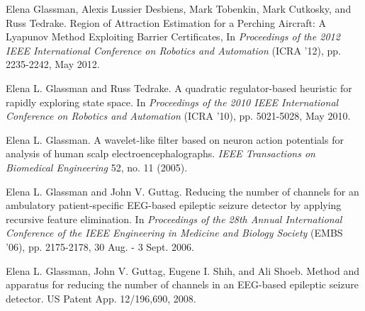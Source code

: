 \documentclass[margin]{res}
\begin{document}
\begin{resume}

Elena Glassman, Alexis Lussier Desbiens, Mark Tobenkin, Mark Cutkosky, and Russ Tedrake. Region of Attraction Estimation for a Perching Aircraft: A Lyapunov Method Exploiting Barrier Certificates, In {\it Proceedings of the 2012 IEEE International Conference on Robotics and Automation} (ICRA '12), pp. 2235-2242, May 2012.


Elena L. Glassman and Russ Tedrake. A quadratic regulator-based heuristic for rapidly exploring state space. In {\it Proceedings of the 2010 IEEE International Conference on Robotics and Automation} (ICRA '10), pp. 5021-5028, May 2010. 

 
Elena L. Glassman. A wavelet-like filter based on neuron action potentials for analysis of human scalp electroencephalographs. \textit{IEEE Transactions on Biomedical Engineering} 52, no. 11 (2005).

Elena L. Glassman and John V. Guttag. Reducing the number of channels for an ambulatory patient-specific EEG-based epileptic seizure detector by applying recursive feature elimination. In \textit{Proceedings of the 28th Annual International Conference of the IEEE Engineering in Medicine and Biology Society} (EMBS '06), pp. 2175-2178, 30 Aug. - 3 Sept. 2006.

Elena L. Glassman, John V. Guttag, Eugene I. Shih, and Ali Shoeb. Method and apparatus for reducing the number of channels in an EEG-based epileptic seizure detector. US Patent App. 12/196,690, 2008.


\end{resume}
\end{document}
